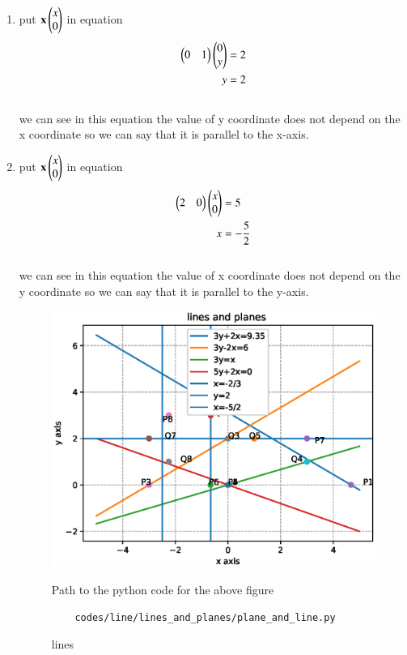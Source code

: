 \begin{enumerate}[label=\arabic*.,ref=\thesubsection.\theenumi]
\begin{enumerate}
\item put $\mathbf {x} \begin{pmatrix}x\\0\end{pmatrix}$ in equation 
\begin{align}
\begin{pmatrix}0& 1\end{pmatrix}\begin{pmatrix}0\\y\end{pmatrix} &= 2
\\
y&= 2
\end{align}
\\
we can see in this equation the  value of y coordinate does not depend on the x coordinate so we can say that it is parallel to the x-axis.



\item put $\mathbf {x} \begin{pmatrix}x\\0\end{pmatrix}$ in equation 
\begin{align}
\begin{pmatrix}2 & 0\end{pmatrix}\begin{pmatrix}x\\0\end{pmatrix} &= 5
\\
x&= -\frac{5}{2}
\end{align}
\\
we can see in this equation the  value of x coordinate does not depend on the y coordinate so we can say that it is parallel to the y-axis.
\begin{figure}[!ht]
	\centering
	\includegraphics[width=\columnwidth]{./figures/line/lines_and_planes/lines_and_planes.eps}
	\caption{lines }
	\label{fig:lines}
	Path to the python code for the above figure
	\begin{lstlisting}
	codes/line/lines_and_planes/plane_and_line.py
	\end{lstlisting} 
\end{figure}

\end{enumerate}
\end{enumerate}
